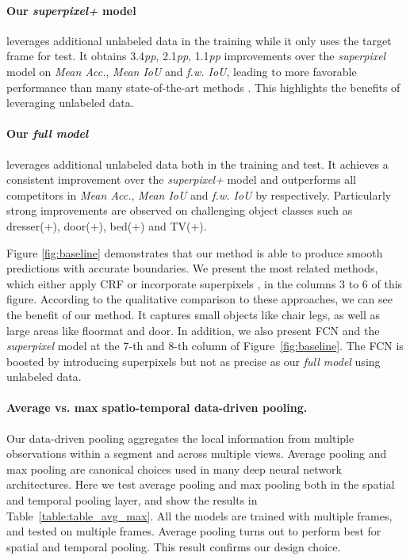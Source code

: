 \paragraph{Our \textit{superpixel+} model} leverages additional unlabeled data in the training while it only uses the target frame for test. It obtains 3.4\textit{pp}, 2.1\textit{pp}, 1.1\textit{pp} improvements over the \textit{superpixel} model on \textit{Mean Acc.}, \textit{Mean IoU} and \textit{f.w. IoU},
leading to more favorable performance than many state-of-the-art methods \cite{deng2015semantic,gupta2014learning,alex2015bayesiansegnet,david2015multiscale,crfasrnn_iccv2015,chen2014semantic,raghudeep2015spCNN,region_end2end2016eccv}.
This highlights the benefits of leveraging unlabeled data.
\paragraph{Our \textit{full model}} leverages additional unlabeled data both in the training and test. It achieves a consistent improvement over the \textit{superpixel+} model and outperforms all competitors in \textit{Mean Acc.}, \textit{Mean IoU} and \textit{f.w. IoU} by  respectively.
Particularly strong improvements are observed on challenging object classes such as dresser(+), door(+), bed(+) and TV(+).

Figure \ref{fig:baseline} demonstrates that our method is able to produce smooth predictions with accurate boundaries.
We present the most related methods, which either apply CRF \cite{crfasrnn_iccv2015, chen2016deeplab} or incorporate superpixels \cite{raghudeep2015spCNN, region_end2end2016eccv}, in the columns 3 to 6 of this figure.
According to the qualitative comparison to these approaches, we can see the benefit of our method. It captures small objects like chair legs, as well as large areas like floormat and door.
In addition, we also present FCN and the \textit{superpixel} model at the 7-th and 8-th column of Figure~\ref{fig:baseline}. The FCN is boosted by introducing superpixels but not as precise as our \textit{full model} using unlabeled data.

\vspace{-0.3cm}
\paragraph{Average vs. max spatio-temporal data-driven pooling.}
Our data-driven pooling aggregates the local information from multiple observations within a segment and across multiple views.
Average pooling and max pooling are canonical choices used in many deep neural network architectures.
Here we test average pooling and max pooling both in the spatial and temporal pooling layer, and show the results in Table~\ref{table:table_avg_max}.
All the models are trained with multiple frames, and tested on multiple frames.
Average pooling turns out to perform best for spatial and temporal pooling. This result confirms our design choice.

